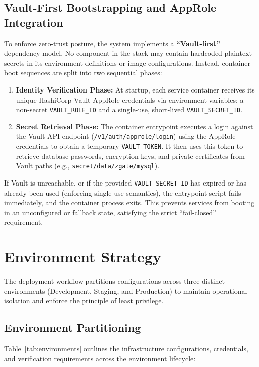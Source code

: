 \subsection{Vault-First Bootstrapping and AppRole Integration}
To enforce zero-trust posture, the system implements a \textbf{``Vault-first''} dependency model. No component in the stack may contain hardcoded plaintext secrets in its environment definitions or image configurations. Instead, container boot sequences are split into two sequential phases:

\begin{enumerate}
    \item \textbf{Identity Verification Phase:} At startup, each service container receives its unique HashiCorp Vault AppRole credentials via environment variables: a non-secret \texttt{VAULT\_ROLE\_ID} and a single-use, short-lived \texttt{VAULT\_SECRET\_ID}.
    \item \textbf{Secret Retrieval Phase:} The container entrypoint executes a login against the Vault API endpoint (\texttt{/v1/auth/approle/login}) using the AppRole credentials to obtain a temporary \texttt{VAULT\_TOKEN}. It then uses this token to retrieve database passwords, encryption keys, and private certificates from Vault paths (e.g., \texttt{secret/data/zgate/mysql}).
\end{enumerate}

If Vault is unreachable, or if the provided \texttt{VAULT\_SECRET\_ID} has expired or has already been used (enforcing single-use semantics), the entrypoint script fails immediately, and the container process exits. This prevents services from booting in an unconfigured or fallback state, satisfying the strict ``fail-closed'' requirement.

\section{Environment Strategy}
The deployment workflow partitions configurations across three distinct environments (Development, Staging, and Production) to maintain operational isolation and enforce the principle of least privilege.

\subsection{Environment Partitioning}
Table~\ref{tab:environments} outlines the infrastructure configurations, credentials, and verification requirements across the environment lifecycle:

